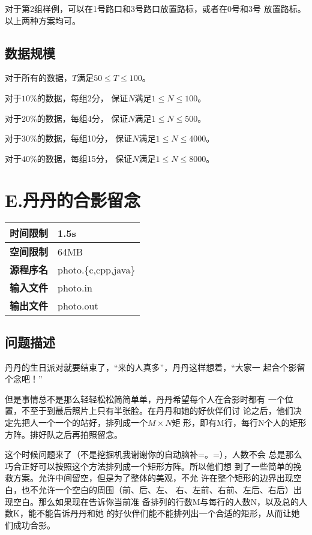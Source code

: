 \documentclass{article}
\begin{document}
对于第2组样例，可以在1号路口和3号路口放置路标，或者在0号和3号
放置路标。以上两种方案均可。

\subsection*{数据规模}
对于所有的数据，$T$满足$50 \leq T \leq 100$。

对于$10\%$的数据，每组2分，
保证$N$满足$1 \leq N \leq 100$。

对于$20\%$的数据，每组4分，
保证$N$满足$1 \leq N \leq 500$。

对于$30\%$的数据，每组10分，
保证$N$满足$1 \leq N \leq 4000$。

对于$40\%$的数据，每组15分，
保证$N$满足$1 \leq N \leq 8000$。

\clearpage

\section*{E.丹丹的合影留念}
\begin{longtable}{|c|l|}
 \hline \bfseries{时间限制} & 1.5s \\
 \hline \bfseries{空间限制} & 64MB \\
 \hline \bfseries{源程序名} & photo.\{c,cpp,java\} \\
 \hline \bfseries{输入文件} & photo.in \\
 \hline \bfseries{输出文件} & photo.out \\
 \hline 
\end{longtable}

\subsection*{问题描述}
丹丹的生日派对就要结束了，“来的人真多”，丹丹这样想着，“大家一
起合个影留个念吧！”

但是事情总不是那么轻轻松松简简单单，丹丹希望每个人在合影时都有
一个位置，不至于到最后照片上只有半张脸。在丹丹和她的好伙伴们讨
论之后，他们决定先把人一个一个的站好，排列成一个$M \times N$矩
形，即有M行，每行N个人的矩形方阵。排好队之后再拍照留念。

这个时候问题来了（不是挖掘机我谢谢你的自动脑补=。=），人数不会
总是那么巧合正好可以按照这个方法排列成一个矩形方阵。所以他们想
到了一些简单的挽救方案。允许中间留空，但是为了整体的美观，不允
许在整个矩形的边界出现空白，也不允许一个空白的周围（前、后、左、
右、左前、右前、左后、右后）出现空白。那么如果现在告诉你当前准
备排列的行数M与每行的人数N，以及总的人数K，能不能告诉丹丹和她
的好伙伴们能不能排列出一个合适的矩形，从而让她们成功合影。
\end{document}
